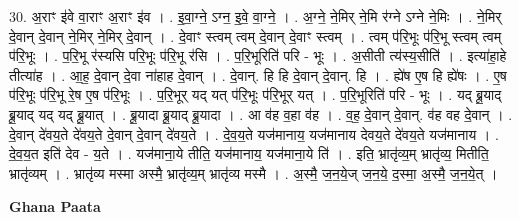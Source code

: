 \documentclass[17pt]{extarticle}
\begin{document}
30. अ॒राꣳ इ॑वे वा॒राꣳ अ॒राꣳ इ॑व । . इ॒वा॒ग्ने॒ ऽग्न॒ इ॒वे॒ वा॒ग्ने॒ । . अ॒ग्ने॒ ने॒मिर् ने॒मि र॑ग्ने ऽग्ने ने॒मिः । . ने॒मिर् दे॒वान् दे॒वान् ने॒मिर् ने॒मिर् दे॒वान् । . दे॒वाꣳ स्त्वम् त्वम् दे॒वान् दे॒वाꣳ स्त्वम् । . त्वम् प॑रि॒भूः प॑रि॒भू स्त्वम् त्वम् प॑रि॒भूः । . प॒रि॒भू र॑स्यसि परि॒भूः प॑रि॒भू र॑सि । . प॒रि॒भूरिति॑ परि - भूः । . अ॒सीती त्य॑स्य॒सीति॑ । . इत्या॑हा॒हे तीत्या॑ह । . आ॒ह॒ दे॒वान् दे॒वा ना॑हाह दे॒वान् । . दे॒वान्. हि हि दे॒वान् दे॒वान्. हि । . ह्ये॑ष ए॒ष हि ह्ये॑षः । . ए॒ष प॑रि॒भूः प॑रि॒भू रे॒ष ए॒ष प॑रि॒भूः । . प॒रि॒भूर् यद् यत् प॑रि॒भूः प॑रि॒भूर् यत् । . प॒रि॒भूरिति॑ परि - भूः । . यद् ब्रू॒याद् ब्रू॒याद् यद् यद् ब्रू॒यात् । . ब्रू॒यादा ब्रू॒याद् ब्रू॒यादा । . आ व॑ह व॒हा व॑ह । . व॒ह॒ दे॒वान् दे॒वान्. व॑ह वह दे॒वान् । . दे॒वान् दे॑वय॒ते दे॑वय॒ते दे॒वान् दे॒वान् दे॑वय॒ते । . दे॒व॒य॒ते यज॑मानाय॒ यज॑मानाय देवय॒ते दे॑वय॒ते यज॑मानाय । . दे॒व॒य॒त इति॑ देव - य॒ते । . यज॑माना॒ये तीति॒ यज॑मानाय॒ यज॑माना॒ये ति॑ । . इति॒ भ्रातृ॑व्य॒म् भ्रातृ॑व्य॒ मितीति॒ भ्रातृ॑व्यम् । . भ्रातृ॑व्य मस्मा अस्मै॒ भ्रातृ॑व्य॒म् भ्रातृ॑व्य मस्मै । . अ॒स्मै॒ ज॒न॒ये॒ज् ज॒न॒ये॒ द॒स्मा॒ अ॒स्मै॒ ज॒न॒ये॒त् । \newline

\textbf{Ghana Paata } \newline
\end{document}
